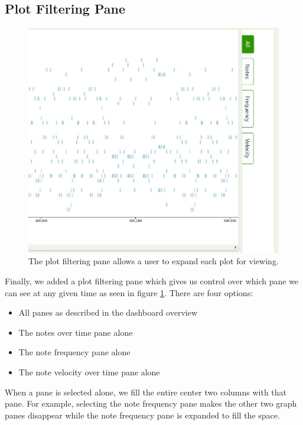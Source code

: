 \documentclass[journal]{vgtc}                %
\begin{document}
\subsection{Plot Filtering Pane}

\begin{figure}[h]
  \centering
  \includegraphics[width=\columnwidth]{plot-filtering-single-track}
  \caption{The plot filtering pane allows a user to expand each plot for viewing.}
  \label{fig:plot-filtering}
\end{figure}

Finally, we added a plot filtering pane which gives us control over which pane
we can see at any given time as seen in figure \ref{fig:plot-filtering}. There
are four options:

\begin{itemize}
  \item All panes as described in the dashboard overview
  \item The notes over time pane alone
  \item The note frequency pane alone
  \item The note velocity over time pane alone
\end{itemize}

When a pane is selected alone, we fill the entire center two columns with that
pane. For example, selecting the note frequency pane makes the other two graph
panes disappear while the note frequency pane is expanded to fill the space.
\end{document}
